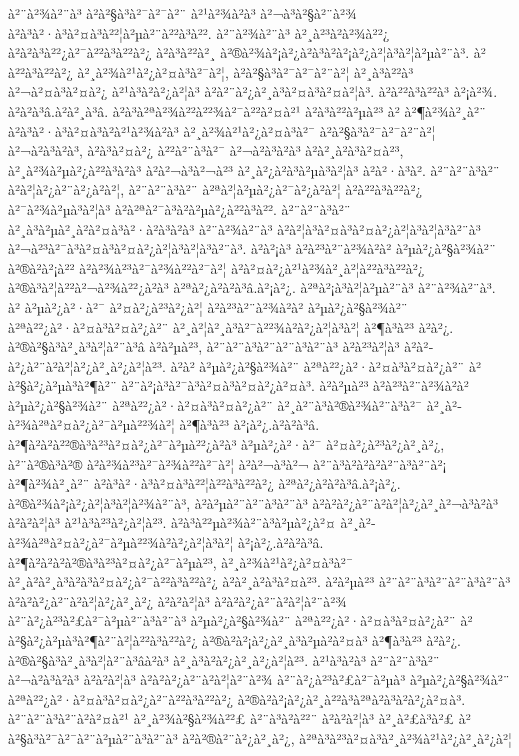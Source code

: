 à²¨à²¾à²¨à³ à²à²§à³à²¯à²¯à²¨ à²¹à²¾à²à³ à²¬à³à²§à²¨à²¾ à²à³à²·à³à²¤à³à²²¦à²µà²¨à²²à³à²². à²¨à²¾à²¨à³ à²¸à²³à²à²¾à²²¿ à²à²à³à²²¿à²¯à²²à³à²²à²¿ à²à³à²²à²¸ à²®à²¾à²¡à²¿à²à³à²à²¡à²¿à²¦à³à²¦à²µà²¨à³. à²à²²à³à²²à²¿ à²¸à²¾à²¹à²¿à²¤à³à²¯à²¦, à²à²§à³à²¯à²¯à²¨à²¦ à²¸à³à²²à³ à²¬à²¤à³à²¤à²¿ à²¹à³à²à²¿à²¦à³ à²à²¨à²¿à²¸à³à²¤à³à²¤à²¦à³. à²à²²à³à²²à³ à²¡à²¾. à²à²à³â.à²à²¸à³â. à²à³à²ªà²¾à²²à²²¾à²¯à²²à²¤à²¹ à²à³à²²à²µà²³ à² à²¶à²¾à²¸à²¨ à²à³à²·à³à²¤à³à²\circ à²¹à²¾à²à³ à²¸à²¾à²¹à²¿à²¤à³à²¯ à²à²§à³à²¯à²¯à²¨à²¦ à²¬à²à³à²à³, à²à³à²¤à²¿ à²²à²¨à³à²¯ à²¬à²à³à²à³ à²à²¸à²à³à²¤à²³, à²¸à²¾à²µà²¿à²²à³à²à³ à²à²¬à³à²¬à²³ à²¸à²¿à²à³à²µà³à²¦à³ à²à²·à³à². à²¨à²¨à³à²¨ à²à²¦à²¿à²¨à²¿à²à²¦, à²¨à²¨à³à²¨ à²ªà²¦à²µà²¿à²¯à²¿à²à²¦ à²à²²à³à²²à²¿ à²¯à²¾à²µà³à²¦à³ à²à²ªà²¯à³à²à²µà²¿à²²à³à²². à²¨à²¨à³à²¨ à²¸à³à²µà²¸à²à²¤à³à²·à²à³à²à³ à²¨à²¾à²¨à³ à²à²¦à³à²¤à³à²¤à²¿à²¦à³à²¦à³à²¨à³ à²¬à²³à²¯à³à²¤à³à²¤à²¿à²¦à³à²¦à³à²¨à³. à²à²¡à³ à²à²³à²¨à²¾à²à² à²µà²¿à²§à²¾à²¨ à²®à²à²¡à²² à²à²¾à²³à²¯à²¾à²²à²¯à²¦ à²à²¤à²¿à²¹à²¾à²¸à²¦à²²à³à²²à²¿ à²®à³à²¦à²²à²¬à²¾à²²¿à²à³ à²ªà²¿à²à²à³â.à²¡à²¿. à²ªà²¡à³à²¦à²µà²¨à³ à²¨à²¾à²¨à³. à² à²µà²¿à²·à²¯ à²¤à²¿à²³à²¿à²¦ à²à²³à²¨à²¾à²à² à²µà²¿à²§à²¾à²¨ à²ªà²²¿à²·à²¤à³à²¤à²¿à²¨ à²¸à²¦à²¸à³à²¯à²²¾à²à²¿à²¦à³à²¦ à²¶à³à²³ à²à²¿. à²®à²§à³à²¸à³à²¦à²¨à³â à²à²µà²³, à²¨à²¨à³à²¨à²¨à³à²¨à³ à²à²³à²¦à³ à²à²­à²¿à²¨à²à²¦à²¿à²¸à²¿à²¦à²³. à²à² à²µà²¿à²§à²¾à²¨ à²ªà²²¿à²·à²¤à³à²¤à²¿à²¨ à²à²§à²¿à²µà³à²¶à²¨ à²¨à²¡à³à²¯à³à²¤à³à²¤à²¿à²¤à³. à²à²µà²³ à²à²³à²¨à²¾à²à² à²µà²¿à²§à²¾à²¨ à²ªà²²¿à²·à²¤à³à²¤à²¿à²¨ à²¸à²¨à³à²®à²¾à²¨à³à²¯ à²¸à²­à²¾à²ªà²¤à²¿à²¯à²µà²²¾à²¦ à²¶à³à²³ à²¡à²¿.à²à²à³â. à²¶à²à²à²²®à³à²³à²¤à²¿à²¯à²µà²²¿à²à³ à²µà²¿à²·à²¯ à²¤à²¿à²³à²¿à²¸à²¿, à²¨à²®à³à²® à²à²¾à²³à²¯à²¾à²²à²¯à²¦ à²à²¬à³à²¬ à²¨à³à²à²\circ à²à²¨à³à²¨à²¡ à²¶à²¾à²¸à²¨ à²à³à²·à³à²¤à³à²²¦à²²à³à²²à²¿ à²ªà²¿à²à²à³â.à²¡à²¿. à²®à²¾à²¡à²¿à²¦à³à²¦à²¾à²¨à³, à²à²µà²¨à²¨à³à²¨à³ à²à²­à²¿à²¨à²à²¦à²¿à²¸à²¬à³à²à³ à²à²à²¦à³ à²¹à³à²³à²¿à²¦à²³. à²à³à²²µà²¾à²¨à³à²µà²¿à²¤ à²¸à²­à²¾à²ªà²¤à²¿à²¯à²µà²²¾à²à²¿à²¦à³à²¦ à²¡à²¿.à²à²à³â. à²¶à²à²à²\circ à²®à³à²³à²¤à²¿à²¯à²µà²³, à²¸à²¾à²¹à²¿à²¤à³à²¯ à²¸à²à²¸à³à²à³à²¤à²¿à²¯à²²à³à²²à²¿ à²à²¸à²à³à²¤à²³. à²à²µà²³ à²¨à²¨à³à²¨à²¨à³à²¨à³ à²à²­à²¿à²¨à²à²¦à²¿à²¸à²¿ à²à²à²¦à³ à²à²­à²¿à²¨à²à²¦à²¨à²¾ à²¨à²¿à²³à²£à²¯à²µà²¨à³à²¨à³ à²µà²¿à²§à²¾à²¨ à²ªà²²¿à²·à²¤à³à²¤à²¿à²¨ à²à²§à²¿à²µà³à²¶à²¨à²¦à²²à³à²²à²¿ à²®à²à²¡à²¿à²¸à³à²µà²à²¤à³ à²¶à³à²³ à²à²¿. à²®à²§à³à²¸à³à²¦à²¨à³âà²à³ à²¸à³à²à²¿à²¸à²¿à²¦à²³. à²¹à³à²à³ à²¨à²¨à³à²¨ à²¬à²à³à²à³ à²à²à²¦à³ à²à²­à²¿à²¨à²à²¦à²¨à²¾ à²¨à²¿à²³à²£à²¯à²µà³ à²µà²¿à²§à²¾à²¨ à²ªà²²¿à²·à²¤à³à²¤à²¿à²¨à²²à³à²²à²¿ à²®à²à²¡à²¿à²¸à²²à³à²ªà²à³à²à²¿à²¤à³. à²¨à²¨à³à²¨à²à²¤à²¹ à²¸à²¾à²§à²¾à²²£ à²¨à³à²à²²¨ à²à²à²¦à³ à²¸à²£à³à²£ à²à²§à³à²¯à²¯à²¨à²µà²¨à³à²¨à³ à²à²®à²¨à²¿à²¸à²¿, à²ªà³à²³à²¤à³à²¸à²¾à²¹à²¿à²¸à²¿à²¦ 